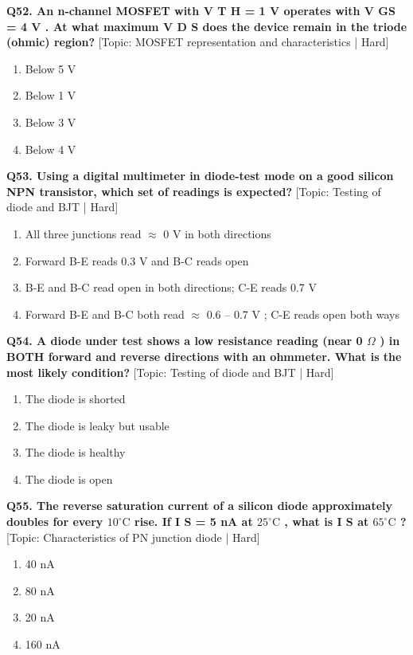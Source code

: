 \noindent\textbf{Q52. An n-channel MOSFET with V T H = 1 V operates with V GS = 4 V . At what maximum V D S does the device remain in the triode (ohmic) region?} \hfill [Topic: MOSFET representation and characteristics | Hard]
\begin{enumerate}[label=(\alph*),topsep=2pt,itemsep=1pt,partopsep=0pt,parsep=0pt]
    \item {Below 5 V}
    \item {Below 1 V}
    \item {Below 3 V}
    \item {Below 4 V}
\end{enumerate}
\vspace{2mm}

\noindent\textbf{Q53. Using a digital multimeter in diode-test mode on a good silicon NPN transistor, which set of readings is expected?} \hfill [Topic: Testing of diode and BJT | Hard]
\begin{enumerate}[label=(\alph*),topsep=2pt,itemsep=1pt,partopsep=0pt,parsep=0pt]
    \item {All three junctions read $\approx$ 0 V in both directions}
    \item {Forward B-E reads 0.3 V and B-C reads open}
    \item {B-E and B-C read open in both directions; C-E reads 0.7 V}
    \item {Forward B-E and B-C both read $\approx$ 0.6 -- 0.7 V ; C-E reads open both ways}
\end{enumerate}
\vspace{2mm}

\noindent\textbf{Q54. A diode under test shows a low resistance reading (near 0 $\Omega$ ) in BOTH forward and reverse directions with an ohmmeter. What is the most likely condition?} \hfill [Topic: Testing of diode and BJT | Hard]
\begin{enumerate}[label=(\alph*),topsep=2pt,itemsep=1pt,partopsep=0pt,parsep=0pt]
    \item {The diode is shorted}
    \item {The diode is leaky but usable}
    \item {The diode is healthy}
    \item {The diode is open}
\end{enumerate}
\vspace{2mm}

\noindent\textbf{Q55. The reverse saturation current of a silicon diode approximately doubles for every $10^\circ\text{C}$ rise. If I S = 5 nA at $25^\circ\text{C}$ , what is I S at $65^\circ\text{C}$ ?} \hfill [Topic: Characteristics of PN junction diode | Hard]
\begin{enumerate}[label=(\alph*),topsep=2pt,itemsep=1pt,partopsep=0pt,parsep=0pt]
    \item {40 nA}
    \item {80 nA}
    \item {20 nA}
    \item {160 nA}
\end{enumerate}
\vspace{2mm}


